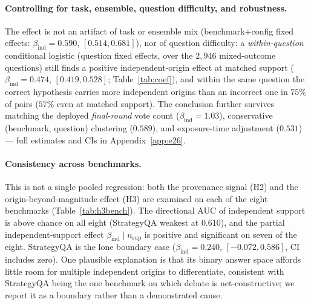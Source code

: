 \paragraph{Controlling for task, ensemble, question difficulty, and robustness.}
\label{par:fixed_effect_results}
The effect is not an artifact of task or ensemble mix (benchmark$+$config fixed effects: $\beta_{\mathrm{ind}}=0.590$,
$[0.514,0.681]$), nor of question difficulty: a \emph{within-question} conditional logistic (question fixed
effects, over the $2{,}946$ mixed-outcome questions) still finds a positive independent-origin effect at
matched support ($\beta_{\mathrm{ind}}=0.474$, $[0.419,0.528]$; Table~\ref{tab:coef}), and within the same
question the correct hypothesis carries more independent origins than an incorrect one in $75\%$ of pairs
($57\%$ even at matched support). \label{par:h3_robustness}The conclusion further survives matching the
deployed \emph{final-round} vote count ($\beta_{\mathrm{ind}}=1.03$), conservative (benchmark, question)
clustering ($0.589$), and exposure-time adjustment ($0.531$) --- full estimates and CIs in
Appendix~\ref{app:e26}.

\paragraph{Consistency across benchmarks.}
\label{par:h3_benchmarks}
This is not a single pooled regression: both the provenance signal (H2) and the origin-beyond-magnitude
effect (H3) are examined on each of the eight benchmarks (Table~\ref{tab:h3bench}). The directional AUC of
independent support is above chance on all eight (StrategyQA weakest at $0.610$), and the partial
independent-support effect $\beta_{\mathrm{ind}}\mid n_{\mathrm{sup}}$ is positive and significant on seven of
the eight. StrategyQA is the lone boundary case ($\beta_{\mathrm{ind}}=0.240$, $[-0.072,0.586]$, CI includes
zero). One plausible explanation is that its binary answer space affords little room for multiple independent
origins to differentiate, consistent with StrategyQA being the one benchmark on which debate is
net-constructive; we report it as a boundary rather than a demonstrated cause.

